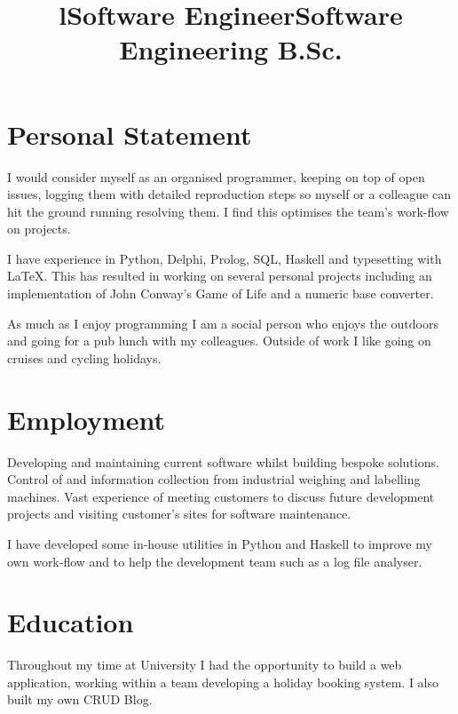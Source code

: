 \documentclass[line,margin]{res}
\title{l} \location{r} \\
\newcommand{\dashsep}{--}
\newcommand{\rangesep}{\dashsep}
\begin{document}
\begin{resume}

\section{Personal Statement}
I would consider myself as an organised programmer, keeping on top of open issues, logging them with detailed reproduction steps so myself or a colleague can hit the ground running resolving them. I find this optimises the team's work-flow on projects.

I have experience in Python, Delphi, Prolog, SQL, Haskell and typesetting with {\LaTeX}. This has resulted in working on several personal projects including an implementation of John Conway's Game of Life and a numeric base converter.

As much as I enjoy programming I am a social person who enjoys the outdoors and going for a pub lunch with my colleagues. Outside of work I like going on cruises and cycling holidays.
\section{Employment}

\title{Software Engineer}
\dates{2010{\rangesep}Present} %
\begin{position}
Developing and maintaining current software whilst building bespoke solutions. Control of and information collection from industrial weighing and labelling machines. Vast experience of meeting customers to discuss future development projects and visiting customer's sites for software maintenance.

I have developed some in-house utilities in Python and Haskell to improve my own work-flow and to help the development team such as a log file analyser.
\end{position}

\section{Education}

\title{Software Engineering B.Sc.} %
\dates{2007{\rangesep}2010}
\begin{position}
Throughout my time at University I had the opportunity to build a web application, working within a team developing a holiday booking system. I also built my own CRUD Blog.


\end{position}
\end{resume}
\end{document}
